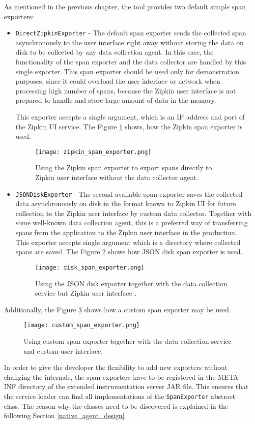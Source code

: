 As mentioned in the previous chapter, the tool provides two default simple span exporters:
\begin{itemize}
	\item  \texttt{DirectZipkinExporter} - The default span exporter sends the collected span asynchronously to the user interface right away without storing the data on disk to be collected by any data collection agent. In this case, the functionality of the span exporter and the data collector are handled by this single exporter. 
	This span exporter should be used only for demonstration purposes, since it could overload the user interface or network when processing high number of spans, because the Zipkin user interface is not prepared to handle and store large amount of data in the memory. 
	
	This exporter accepts a single argument, which is an IP address and port of the Zipkin UI service. The Figure \ref{fig:zipkin_span_exporter} shows, how the Zipkin span exporter is used.
	
	\begin{figure}
		\centering
		\texttt{[image: zipkin\_span\_exporter.png]}
		\caption{Using the Zipkin span exporter to export spans directly to Zipkin user interface without the data collector agent.}
		\label{fig:zipkin_span_exporter}
	\end{figure}
	\item  \texttt{JSONDiskExporter} - The second available span exporter saves the collected data asynchronously on disk in the format known to Zipkin UI for future collection to the Zipkin user interface by custom data collector. Together with some well-known data collection agent, this is a preferred way of transferring spans from the application to the Zipkin user interface in the production. This exporter accepts single argument which is a directory where collected spans are saved. The Figure \ref{fig:disk_span_exporter} shows how JSON disk span exporter is used.
	\begin{figure}
		\centering
		\texttt{[image: disk\_span\_exporter.png]}
		\caption{Using the JSON disk exporter together with the data collection service but Zipkin user interface .}
		\label{fig:disk_span_exporter}
	\end{figure}
\end{itemize}
Additionally, the Figure \ref{fig:custom_span_exporter} shows how a custom span exporter may be used.

\begin{figure}
	\centering
	\texttt{[image: custom\_span\_exporter.png]}
	\caption{Using custom span exporter together with the data collection service and custom user interface.}
	\label{fig:custom_span_exporter}
\end{figure}
In order to give the developer the flexibility to add new exporters without changing the internals, the span exporters have to be  registered in the META-INF directory of the extended instrumentation server JAR file. This ensures that the service loader can find all implementations of the \texttt{SpanExporter} abstract class. The reason why the classes need to be discovered is explained in the following Section \ref{native_agent_design}

